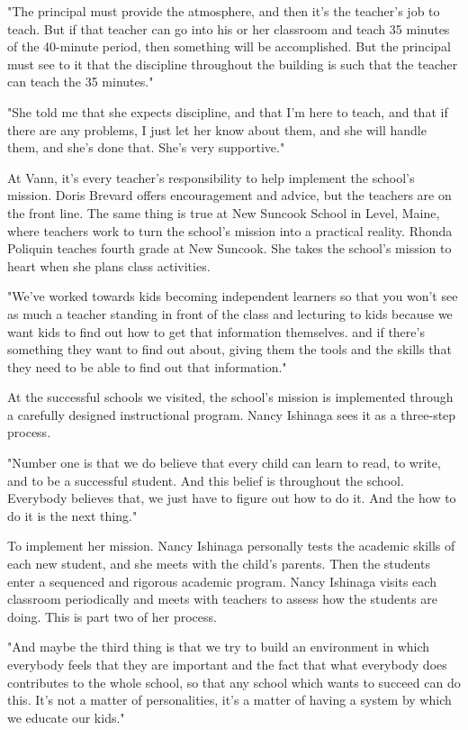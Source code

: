 "The principal must provide the atmosphere, and then it's the teacher's job to teach. But if that teacher can go into his or her classroom and teach 35 minutes of the 40-minute period, then something will be accomplished.
But the principal must see to it that the discipline throughout the building is such that the teacher can teach the 35 minutes."

"She told me that she expects discipline, and that I'm here to teach, and that if there are any problems, I just let her know about them, and she will handle them, and she's done that. She's very supportive."

At Vann, it's every teacher's responsibility to help implement the school's mission. Doris Brevard offers encouragement and advice, but the teachers are on the front line. The same thing is true at New Suncook School in Level, Maine, where teachers work to turn the school's mission into a practical reality. Rhonda Poliquin teaches fourth grade at New Suncook. She takes the school's mission to heart when she plans class activities.

"We've worked towards kids becoming independent learners so that you won't see as much a teacher standing in front of the class and lecturing to kids because we want kids to find out how to get that information themselves. and if there's something they want to find out about, giving them the tools and the skills that they need to be able to find out that information."

At the successful schools we visited, the school's mission is implemented through a carefully designed instructional program. Nancy Ishinaga sees it as a three-step process.

"Number one is that we do believe that every child can learn to read, to write, and to be a successful student. And this belief is throughout the school. Everybody believes that, we just have to figure out how to do it. And the how to do it is the next thing."

To implement her mission. Nancy Ishinaga personally tests the academic skills of each new student, and she meets with the child's parents. Then the students enter a sequenced and rigorous academic program. Nancy Ishinaga visits each classroom periodically and meets with teachers to assess how the students are doing. This is part two of her process.

"And maybe the third thing is that we try to build an environment in which everybody feels that they are important and the fact that what everybody does contributes to the whole school, so that any school which wants to succeed can do this. It's not a matter of personalities, it's a matter of having a system by which we educate our kids."

